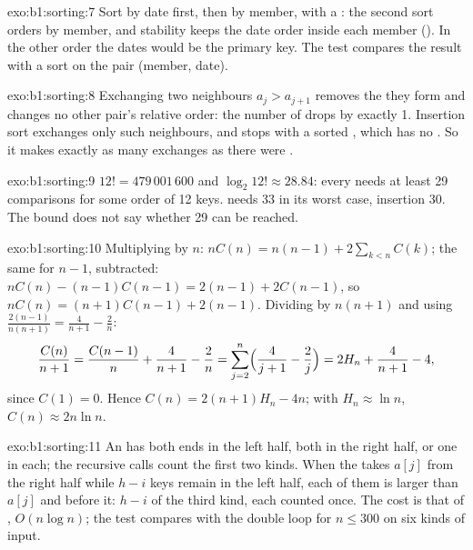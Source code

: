 \begin{solution}{exo:b1:sorting:7}
Sort by date first, then by member, with a : the second sort orders by member, and stability keeps the date
order inside each member (). In the other order the dates would be the primary key.
The test compares the result with a sort on the pair (member, date).
\end{solution}

\begin{solution}{exo:b1:sorting:8}
Exchanging two neighbours $a_j > a_{j+1}$ removes the  they form and changes no other pair's relative order:
the number of  drops by exactly 1. Insertion sort exchanges only such neighbours, and stops with a sorted
, which has no . So it makes exactly as many exchanges as there were .
\end{solution}

\begin{solution}{exo:b1:sorting:9}
$12! = 479\,001\,600$ and $\log_2 12! \approx 28.84$: every  needs at least 29 comparisons for some order
of 12 keys.  needs 33 in its worst case,  insertion 30. The bound does not say whether 29 can be reached.
\end{solution}

\begin{solution}{exo:b1:sorting:10}
Multiplying by $n$: $nC(n) = n(n - 1) + 2\sum_{k<n} C(k)$; the same for $n - 1$, subtracted:
$nC(n) - (n - 1)C(n - 1) = 2(n - 1) + 2C(n - 1)$, so $nC(n) = (n + 1)C(n - 1) + 2(n - 1)$. Dividing by $n(n + 1)$ and
using $\frac{2(n - 1)}{n(n + 1)} = \frac{4}{n + 1} - \frac2n$:
\[ \frac{C(n)}{n + 1} = \frac{C(n - 1)}{n} + \frac{4}{n + 1} - \frac2n = \sum_{j=2}^{n} \Bigl(\frac{4}{j + 1} -
\frac2j\Bigr) = 2H_n + \frac{4}{n + 1} - 4, \]
since $C(1) = 0$. Hence $C(n) = 2(n + 1)H_n - 4n$; with $H_n \approx \ln n$, $C(n) \approx 2n \ln n$.
\end{solution}

\begin{solution}{exo:b1:sorting:11}
An  has both ends in the left half, both in the right half, or one in each; the recursive calls count the first
two kinds. When the  takes $a[j]$ from the right half while $h - i$ keys remain in the left half, each of them is
larger than $a[j]$ and before it: $h - i$  of the third kind, each counted once. The cost is that of , $O(n \log n)$; the test compares with the double loop for $n \leq 300$ on six kinds of input.
\end{solution}

